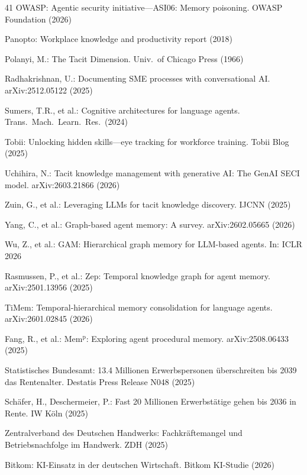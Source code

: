 \documentclass[]{ceurart}
\begin{document}
\begin{thebibliography}{41}
 OWASP: Agentic security initiative---ASI06: Memory
  poisoning. OWASP Foundation (2026)

 Panopto: Workplace knowledge and productivity
  report (2018)

 Polanyi, M.: The Tacit Dimension. Univ.\ of
  Chicago Press (1966)

 Radhakrishnan, U.: Documenting SME processes
  with conversational AI. arXiv:2512.05122 (2025)

 Sumers, T.R., et al.: Cognitive architectures
  for language agents. Trans.\ Mach.\ Learn.\ Res.\ (2024)

 Tobii: Unlocking hidden skills---eye tracking for
  workforce training. Tobii Blog (2025)

 Uchihira, N.: Tacit knowledge management with
  generative AI: The GenAI SECI model. arXiv:2603.21866 (2026)

 Zuin, G., et al.: Leveraging LLMs for tacit
  knowledge discovery. IJCNN (2025)

 Yang, C., et al.: Graph-based agent
  memory: A survey. arXiv:2602.05665 (2026)

 Wu, Z., et al.: GAM: Hierarchical graph memory for
  LLM-based agents. In: ICLR 2026

 Rasmussen, P., et al.: Zep: Temporal knowledge
  graph for agent memory. arXiv:2501.13956 (2025)

 TiMem: Temporal-hierarchical memory consolidation
  for language agents. arXiv:2601.02845 (2026)

 Fang, R., et al.: Mem$^{\mathrm{p}}$: Exploring
  agent procedural memory. arXiv:2508.06433 (2025)

 Statistisches Bundesamt: 13.4 Millionen
  Erwerbspersonen \"uberschreiten bis 2039 das Rentenalter. Destatis
  Press Release N048 (2025)

 Sch\"afer, H., Deschermeier, P.: Fast 20
  Millionen Erwerbst\"atige gehen bis 2036 in Rente. IW K\"oln (2025)

 Zentralverband des Deutschen Handwerks:
  Fachkr\"aftemangel und Betriebsnachfolge im Handwerk. ZDH (2025)

 Bitkom: KI-Einsatz in der deutschen Wirtschaft.
  Bitkom KI-Studie (2026)


\end{thebibliography}
\end{document}

